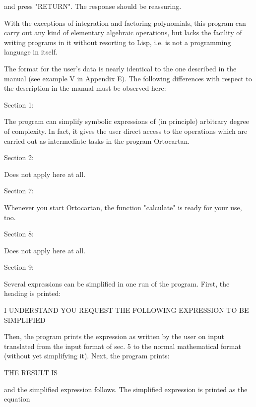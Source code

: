 \bigskip

\noindent and press "RETURN". The response should be reassuring.

With the exceptions of integration and factoring  polynomials,  this  program
can carry out any kind of elementary algebraic operations, but lacks the
facility of writing programs  in  it  without resorting to Lisp, i.e. is not a
programming language in itself.

The format for the user's data is nearly  identical  to
     the  one  described in the manual (see example V in Appendix
     E). The following differences with respect to the description in the
     manual must be observed here:

\medskip

Section 1:

The program can simplify symbolic  expressions  of  (in
     principle) arbitrary degree of complexity. In fact, it gives
the user direct access to the operations  which  are carried out as
intermediate tasks in the program Ortocartan.

\medskip

Section 2:

Does not apply here at all.

\medskip

Section 7:

Whenever you start Ortocartan, the function "calculate" is  ready  for
     your use, too.

\medskip

Section 8:

Does not apply here at all.

\medskip

Section 9:

Several expressions can be simplified in one run of the
     program. First, the heading is printed:

\medskip

I UNDERSTAND YOU REQUEST THE FOLLOWING EXPRESSION TO BE SIMPLIFIED

\medskip

\noindent Then, the program prints the expression as  written  by  the
     user  on input translated from the input format of sec. 5 to
     the normal mathematical format (without yet simplifying it).
     Next, the program prints:

\medskip

THE RESULT IS

\medskip

\noindent and the simplified expression follows.  The  simplified  expression
is printed as the equation

